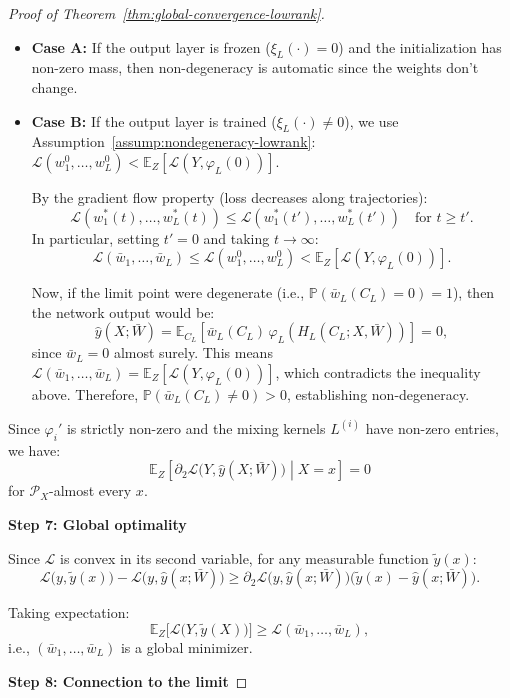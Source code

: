 \documentclass[11pt]{article}
\newcommand{\E}{\mathbb{E}}
\newcommand{\Pp}{\mathbb{P}}
\newcommand{\1}{\mathbbm{1}}
\begin{document}
\begin{proof}[Proof of Theorem~\ref{thm:global-convergence-lowrank}]
\begin{itemize}
\item \textbf{Case A:} If the output layer is frozen ($\xi_L(\cdot) = 0$) and the initialization has non-zero mass, then non-degeneracy is automatic since the weights don't change.

\item \textbf{Case B:} If the output layer is trained ($\xi_L(\cdot) \ne 0$), we use Assumption~\ref{assump:nondegeneracy-lowrank}: $\mathscr{L}(w_1^0,\ldots,w_L^0) < \E_Z[\mathcal{L}(Y,\varphi_L(0))]$.

By the gradient flow property (loss decreases along trajectories):
\[
\mathscr{L}(w_1^*(t),\ldots,w_L^*(t)) \le \mathscr{L}(w_1^*(t'),\ldots,w_L^*(t')) \quad \text{for } t\ge t'.
\]
In particular, setting $t'=0$ and taking $t\to\infty$:
\[
\mathscr{L}(\bar{w}_1,\ldots,\bar{w}_L) \le \mathscr{L}(w_1^0,\ldots,w_L^0) < \E_Z[\mathcal{L}(Y,\varphi_L(0))].
\]

Now, if the limit point were degenerate (i.e., $\Pp(\bar{w}_L(C_L) = 0) = 1$), then the network output would be:
\[
\hat{y}(X; \bar{W}) = \E_{C_L}[\bar{w}_L(C_L)\,\varphi_L(H_L(C_L; X, \bar{W}))] = 0,
\]
since $\bar{w}_L = 0$ almost surely. This means $\mathscr{L}(\bar{w}_1,\ldots,\bar{w}_L) = \E_Z[\mathcal{L}(Y, \varphi_L(0))]$, which contradicts the inequality above. Therefore, $\Pp(\bar{w}_L(C_L) \ne 0) > 0$, establishing non-degeneracy.
\end{itemize}

Since $\varphi_i'$ is strictly non-zero and the mixing kernels $L^{(i)}$ have non-zero entries, we have:
\[
\E_{Z}\!\left[\partial_2\mathcal{L}\big(Y,\hat y(X;\bar{W})\big)\middle|X=x\right] = 0
\]
for $\mathcal{P}_X$-almost every $x$.

\textbf{Step 7: Global optimality}

Since $\mathcal{L}$ is convex in its second variable, for any measurable function $\tilde{y}(x)$:
\[
\mathcal{L}\big(y,\tilde{y}(x)\big)-\mathcal{L}\big(y,\hat y(x;\bar{W})\big) \ge \partial_2\mathcal{L}\big(y,\hat y(x;\bar{W})\big)\big(\tilde{y}(x)-\hat y(x;\bar{W})\big).
\]

Taking expectation:
\[
\E_Z\big[\mathcal{L}\big(Y,\tilde{y}(X)\big)\big] \ge \mathscr{L}(\bar{w}_1,\ldots,\bar{w}_L),
\]
i.e., $(\bar{w}_1,\ldots,\bar{w}_L)$ is a global minimizer.

\textbf{Step 8: Connection to the limit}


\end{proof}
\end{document}
